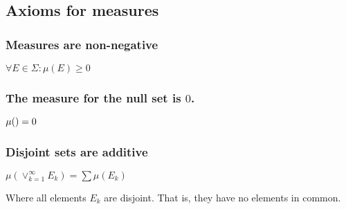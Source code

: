 
\subsection{Axioms for measures}


\subsubsection{Measures are non-negative}

$\forall E \in \Sigma : \mu (E)\ge 0$

\subsubsection{The measure for the null set is \(0\).}

$\mu (\null )=0$

\subsubsection{Disjoint sets are additive}

$\mu (\lor_{k=1}^{\infty} E_k)=\sum \mu (E_k)$

Where all elements \(E_k\) are disjoint. That is, they have no elements in common.


